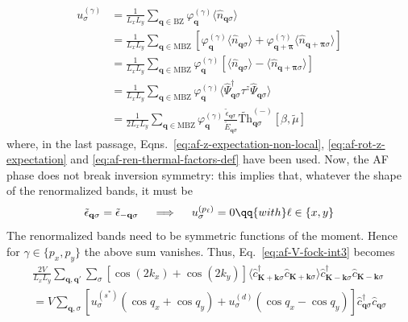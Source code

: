 \begin{align}
	u^{(\gamma)}_\sigma &= \frac{1}{L_x L_y} \sum_{\mathbf{q}\in\mathrm{BZ}} \varphi_\mathbf{q}^{(\gamma)}
	\langle
		\hat n_{\mathbf{q}\sigma}
	\rangle \nonumber\\
	&= \frac{1}{L_x L_y} \sum_{\mathbf{q}\in\mathrm{MBZ}} \left[
		\varphi_\mathbf{q}^{(\gamma)}
		\langle
			\hat n_{\mathbf{q}\sigma}
		\rangle
		+
		\varphi_{\mathbf{q}+\bm{\pi}}^{(\gamma)}
		\langle
			\hat n_{\mathbf{q}+\bm{\pi}\sigma}
		\rangle
	\right] \nonumber\\
	&= \frac{1}{L_x L_y} \sum_{\mathbf{q}\in\mathrm{MBZ}} \varphi_\mathbf{q}^{(\gamma)} \left[
		\langle
			\hat n_{\mathbf{q}\sigma}
		\rangle
		-
		\langle
			\hat n_{\mathbf{q}+\bm{\pi}\sigma}
		\rangle
	\right] \nonumber\\
	&= \frac{1}{L_x L_y} \sum_{\mathbf{q}\in\mathrm{MBZ}} \varphi_\mathbf{q}^{(\gamma)}
	\langle
		\hat \Psi_{\mathbf{q}\sigma}^\dagger \tau^z \hat \Psi_{\mathbf{q}\sigma}
	\rangle \nonumber\\
	&= \frac{1}{2L_x L_y} \sum_{\mathbf{q}\in\mathrm{MBZ}} \varphi_\mathbf{q}^{(\gamma)}
	\frac{\tilde{\epsilon}_{\mathbf{q}\sigma}}{\tilde{E}_{\mathbf{q}\sigma}} \tilde{\mathrm{Th}}_{\mathbf{q}\sigma}^{(-)}[\beta,\tilde{\mu}] \label{eq:af-ugamma-chain}
\end{align}
where, in the last passage, Eqns.~\eqref{eq:af-z-expectation-non-local}, \eqref{eq:af-rot-z-expectation} and \eqref{eq:af-ren-thermal-factors-def} have been used. Now, the AF phase does not break inversion symmetry: this implies that, whatever the shape of the renormalized bands, it must be
\[
	\tilde{\epsilon}_{\mathbf{q}\sigma} = \tilde{\epsilon}_{-\mathbf{q}\sigma}
	\quad\implies\quad
	u^{(p_\ell)}_\sigma = 0
	\qq{with}
	\ell\in\lbrace x,y \rbrace
\]
The renormalized bands need to be symmetric functions of the moment. Hence for $\gamma\in\lbrace p_x, p_y \rbrace$ the above sum vanishes. Thus, Eq.~\eqref{eq:af-V-fock-int3} becomes
\begin{multline}
		\frac{2V}{L_x L_y} \sum_{\mathbf{q}, \mathbf{q}'} \sum_\sigma \left[
			\cos \left(
				2k_x
		\right)	+ \cos \left(
				2k_y
		\right)
	\right] \langle
	\hat c_{\mathbf{K}+\mathbf{k} \sigma}^\dagger
	\hat c_{\mathbf{K}+\mathbf{k} \sigma}
	\rangle
	\hat c_{\mathbf{K}-\mathbf{k} \sigma}^\dagger  \hat c_{\mathbf{K}-\mathbf{k}\sigma} \nonumber \\
	= V \sum_{\mathbf{q},\sigma} \left[
		u^{(s^*)}_\sigma (\cos q_x + \cos q_y) + u^{(d)}_\sigma (\cos q_x - \cos q_y)
	\right] \hat c_{\mathbf{q} \sigma}^\dagger
	\hat c_{\mathbf{q}\sigma}
\end{multline}
